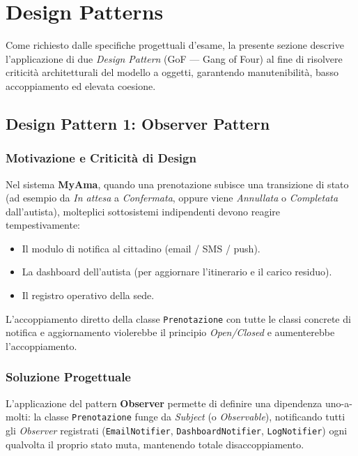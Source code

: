 \section{Design Patterns}

Come richiesto dalle specifiche progettuali d'esame, la presente sezione descrive l'applicazione di due \textit{Design Pattern} (GoF --- Gang of Four) al fine di risolvere criticità architetturali del modello a oggetti, garantendo manutenibilità, basso accoppiamento ed elevata coesione.

\subsection{Design Pattern 1: Observer Pattern}

\subsubsection{Motivazione e Criticità di Design}
Nel sistema \textbf{MyAma}, quando una prenotazione subisce una transizione di stato (ad esempio da \textit{In attesa} a \textit{Confermata}, oppure viene \textit{Annullata} o \textit{Completata} dall'autista), molteplici sottosistemi indipendenti devono reagire tempestivamente:
\begin{itemize}
    \item Il modulo di notifica al cittadino (email / SMS / push).
    \item La dashboard dell'autista (per aggiornare l'itinerario e il carico residuo).
    \item Il registro operativo della sede.
\end{itemize}
L'accoppiamento diretto della classe \texttt{Prenotazione} con tutte le classi concrete di notifica e aggiornamento violerebbe il principio \textit{Open/Closed} e aumenterebbe l'accoppiamento.

\subsubsection{Soluzione Progettuale}
L'applicazione del pattern \textbf{Observer} permette di definire una dipendenza uno-a-molti: la classe \texttt{Prenotazione} funge da \textit{Subject} (o \textit{Observable}), notificando tutti gli \textit{Observer} registrati (\texttt{EmailNotifier}, \texttt{DashboardNotifier}, \texttt{LogNotifier}) ogni qualvolta il proprio stato muta, mantenendo totale disaccoppiamento.

